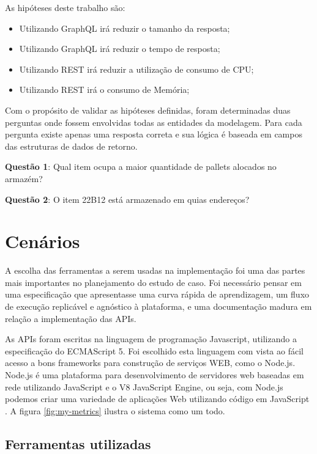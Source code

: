 As hipóteses deste trabalho são: 

\begin{itemize}
\item Utilizando GraphQL irá reduzir o tamanho da resposta;
\item Utilizando GraphQL irá reduzir o tempo de resposta;
\item Utilizando REST irá reduzir a utilização de consumo de CPU;
\item Utilizando REST irá o consumo de Memória;
\end{itemize}

Com o propósito de validar as hipóteses definidas, foram determinadas duas perguntas onde fossem envolvidas todas as entidades da modelagem. Para cada pergunta existe apenas uma resposta correta e sua lógica é baseada em campos das estruturas de dados de retorno.

\textbf{Questão 1}: Qual item ocupa a maior quantidade de pallets alocados no armazém?

\textbf{Questão 2}: O item 22B12 está armazenado em quias endereços?


\section{Cenários} \label{sec:cenarios}

A escolha das ferramentas a serem usadas na implementação foi uma das partes mais importantes no planejamento do estudo de caso. Foi necessário pensar em uma especificação que apresentasse uma curva rápida de aprendizagem, um fluxo de execução replicável e agnóstico à plataforma, e uma documentação madura em relação a implementação das APIs.

As APIs foram escritas na linguagem de programação Javascript, utilizando a especificação do ECMAScript 5. Foi escolhido esta linguagem com vista ao fácil acesso a bons frameworks para construção de serviços WEB, como o Node.js. Node.js é uma plataforma para desenvolvimento de servidores web baseadas em rede utilizando JavaScript e o V8 JavaScript Engine, ou seja, com Node.js podemos criar uma variedade de aplicações Web utilizando código em JavaScript . A figura \ref{fig:my-metrics} ilustra o sistema como um todo.


\subsection{Ferramentas utilizadas}

